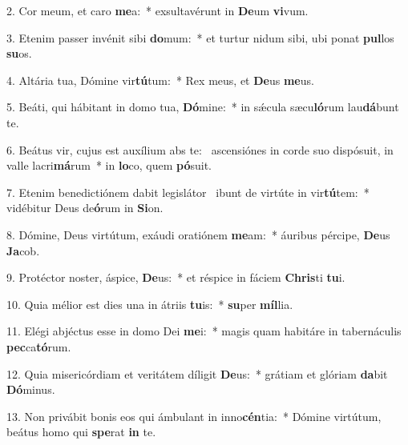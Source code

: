 2. Cor meum, et caro \textbf{me}a:~*  exsultavérunt in \textbf{De}um \textbf{vi}vum.\

3. Etenim passer invénit sibi \textbf{do}mum:~*  et turtur nidum sibi, ubi ponat \textbf{pul}los \textbf{su}os.\

4. Altária tua, Dómine vir\textbf{tú}tum:~*  Rex meus, et \textbf{De}us \textbf{me}us.\

5. Beáti, qui hábitant in domo tua, \textbf{Dó}mine:~*  in sǽcula sæcu\textbf{ló}rum lau\textbf{dá}bunt te.\

6. Beátus vir, cujus est auxílium abs te: \dag\  ascensiónes in corde suo dispósuit, in valle lacri\textbf{má}rum~*  in \textbf{lo}co, quem \textbf{pó}suit.\

7. Etenim benedictiónem dabit legislátor \dag\  ibunt de virtúte in vir\textbf{tú}tem:~*  vidébitur Deus de\textbf{ó}rum in \textbf{Si}on.\

8. Dómine, Deus virtútum, exáudi oratiónem \textbf{me}am:~*  áuribus pércipe, \textbf{De}us \textbf{Ja}cob.\

9. Protéctor noster, áspice, \textbf{De}us:~*  et réspice in fáciem \textbf{Chris}ti \textbf{tu}i.\

10. Quia mélior est dies una in átriis \textbf{tu}is:~*  \textbf{su}per \textbf{míl}lia.\

11. Elégi abjéctus esse in domo Dei \textbf{me}i:~*  magis quam habitáre in tabernáculis \textbf{pec}ca\textbf{tó}rum.\

12. Quia misericórdiam et veritátem díligit \textbf{De}us:~*  grátiam et glóriam \textbf{da}bit \textbf{Dó}minus.\

13. Non privábit bonis eos qui ámbulant in inno\textbf{cén}tia:~*  Dómine virtútum, beátus homo qui \textbf{spe}rat \textbf{in} te.\

